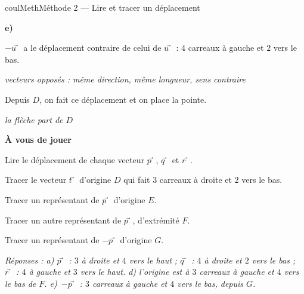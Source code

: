 \documentclass[11pt,a4paper]{article}
\makeatletter
\newcommand{\quadrillage}[4]{\draw[grille,step=1] (#1,#2) grid (#3,#4);}
\newcommand{\pt}[3]{\path (#1) node[croix]{} node[#2,font=\small,inner sep=2.5pt]{$#3$};}
\newcounter{lycee@signet}
\newcommand{\signet}[3][]{\stepcounter{lycee@signet}%
  \edef\lycee@dest{\if\relax\detokenize{#1}\relax
    signet.\arabic{lycee@signet}\else#1\fi}%
  \hypertarget{\lycee@dest}{}\bookmark[level=#2,dest=\lycee@dest]{#3}}
\def\vec#1{#1⃗}}%
\newcounter{methode}
\newenvironment{methodebox}[1][Méthode]{\stepcounter{methode}%
  \begin{boitecours}[phantom={\signet[methode-\arabic{methode}]{2}{#1}}]{coulMeth}{#1}}%
  {\end{boitecours}}
\newcommand{\etape}[1]{\par\smallskip\textbf{\color{coulMeth}#1}\par\nobreak\smallskip}
\newcommand{\reponse}[1]{\par\smallskip
  {\footnotesize\itshape\color{black!55}Réponses : #1}}
\newcommand{\explique}[2]{\par\smallskip\noindent
  \begin{minipage}[t]{0.57\linewidth}\raggedright #1\end{minipage}\hfill
  \begin{minipage}[t]{0.40\linewidth}\raggedright\leavevmode
    {\small\itshape\color{black!60}#2}\end{minipage}\par}
\newcommand{\cas}[1]{\par\smallskip\noindent\textbf{\color{coulExo}#1}\vadjust{\nobreak}}
\newenvironment{correction}{\par}{\par}
\makeatother
\begin{document}
\begin{methodebox}[Méthode 2 --- Lire et tracer un déplacement]
\begin{correction}
\cas{e)}\par\nopagebreak
\begin{minipage}[t]{0.72\linewidth}
\explique{$-\vec{u}$ a le déplacement contraire de celui de $\vec{u}$ : $4$ carreaux à
gauche et $2$ vers le bas.}{vecteurs opposés : même direction, même longueur, sens
contraire}
\explique{Depuis $D$, on fait ce déplacement et on place la pointe.}{la flèche part de $D$}
\end{minipage}\hfill
\begin{minipage}[t]{0.26\linewidth}
\vspace{0pt}\centering
{}
\end{minipage}
\end{correction}

\etape{À vous de jouer}
\begin{questions}[label=\alph*)]
  \item Lire le déplacement de chaque vecteur $\vec{p}$, $\vec{q}$ et $\vec{r}$.
  \item Tracer le vecteur $\vec{t}$ d'origine $D$ qui fait $3$ carreaux à droite et $2$
        vers le bas.
  \item Tracer un représentant de $\vec{p}$ d'origine $E$.
  \item Tracer un autre représentant de $\vec{p}$, d'extrémité $F$.
  \item Tracer un représentant de $-\vec{p}$ d'origine $G$.
\end{questions}
\begin{center}
\quad
{}
\end{center}
\reponse{a) $\vec{p}$ : $3$ à droite et $4$ vers le haut ; $\vec{q}$ : $4$ à droite et $2$
vers le bas ; $\vec{r}$ : $4$ à gauche et $3$ vers le haut.\; d) l'origine est à $3$
carreaux à gauche et $4$ vers le bas de $F$.\; e)~$-\vec{p}$ : $3$ carreaux à gauche et
$4$ vers le bas, depuis $G$.}
\end{methodebox}
\end{document}
